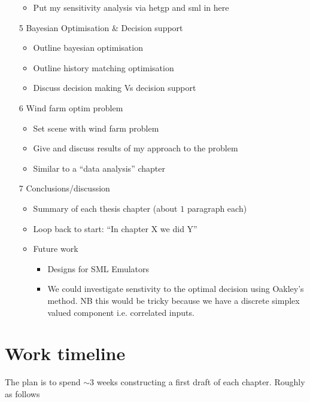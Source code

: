 \documentclass[12pt]{article}
\begin{document}
\begin{itemize}
\begin{itemize}
		\item Put my sensitivity analysis via hetgp and sml in here
	\end{itemize}
	\item[5] Bayesian Optimisation \& Decision support
	\begin{itemize}
		\item Outline bayesian optimisation
		\item Outline history matching optimisation
		\item Discuss decision making Vs decision support
	\end{itemize}
	\item[6] Wind farm optim problem
	\begin{itemize}
		\item Set scene with wind farm problem
		\item Give and discuss results of my approach to the problem
		\item Similar to a ``data analysis'' chapter
	\end{itemize}
	\item[7] Conclusions/discussion
	\begin{itemize}
		\item Summary of each thesis chapter (about $1$ paragraph each)
		\item Loop back to start: ``In chapter X we did Y''
		\item Future work
		\begin{itemize}
			\item Designs for SML Emulators
			\item We could investigate senstivity to the optimal decision using Oakley's method. NB this would be tricky because we have a discrete simplex valued component i.e. correlated inputs.
		\end{itemize}
	\end{itemize}
\end{itemize}
\section{Work timeline}
The plan is to spend $\sim 3$ weeks constructing a first draft of each chapter. Roughly as follows
\end{document}
